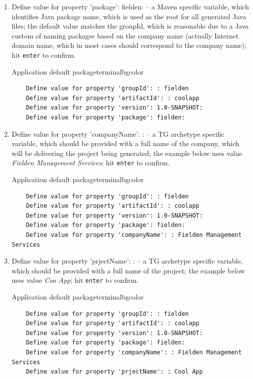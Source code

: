 \begin{enumerate}
    \item Define value for property 'package': fielden: -- a Maven specific variable, which identifies Java package name, which is used as the root for all generated Java files; the default value matches the groupId, which is reasonable due to a Java custom of naming packages based on the company name (actually Internet domain name, which in most cases should correspond to the company name); hit \texttt{enter} to confirm.
    
    \begin{code}{Application default package}{\label{lst::archetype-package}}{terminalbgcolor}
      \begin{lstlisting}
	Define value for property 'groupId': : fielden		
	Define value for property 'artifactId': : coolapp
	Define value for property 'version': 1.0-SNAPSHOT:
	Define value for property 'package': fielden:
      \end{lstlisting}
    \end{code}

    \item Define value for property 'companyName': : -- a TG archetype specific variable, which should be provided with a full name of the company, which will be delivering the project being generated; the example below uses value \emph{Fielden Management Services}; hit \texttt{enter} to confirm.
    
    \begin{code}{Application default package}{\label{lst::archetype-package}}{terminalbgcolor}
      \begin{lstlisting}
	Define value for property 'groupId': : fielden		
	Define value for property 'artifactId': : coolapp
	Define value for property 'version': 1.0-SNAPSHOT:
	Define value for property 'package': fielden:
	Define value for property 'companyName': : Fielden Management Services
      \end{lstlisting}
    \end{code}

    \item Define value for property 'prjectName': : -- a TG archetype specific variable, which should be provided with a full name of the project; the example below uses value \emph{Coo App}; hit \texttt{enter} to confirm.
    
    \begin{code}{Application default package}{\label{lst::archetype-package}}{terminalbgcolor}
      \begin{lstlisting}
	Define value for property 'groupId': : fielden		
	Define value for property 'artifactId': : coolapp
	Define value for property 'version': 1.0-SNAPSHOT:
	Define value for property 'package': fielden:
	Define value for property 'companyName': : Fielden Management Services
	Define value for property 'prjectName': : Cool App
      \end{lstlisting}
    \end{code}


\end{enumerate}
